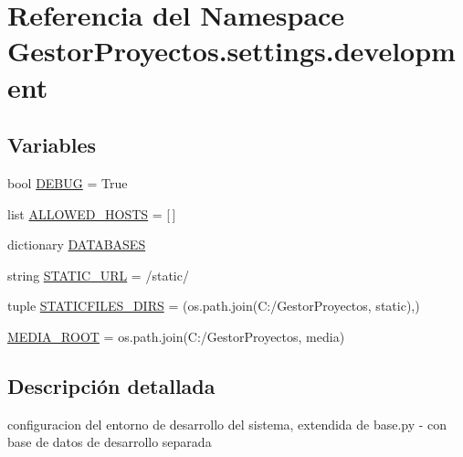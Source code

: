 \hypertarget{namespace_gestor_proyectos_1_1settings_1_1development}{}\section{Referencia del Namespace Gestor\+Proyectos.\+settings.\+development}
\label{namespace_gestor_proyectos_1_1settings_1_1development}
\subsection*{Variables}
\begin{DoxyCompactItemize}
\item 
bool \hyperlink{namespace_gestor_proyectos_1_1settings_1_1development_a36c3ebf8a573165139bc1e71d7fdb026}{D\+E\+B\+UG} = True
\item 
list \hyperlink{namespace_gestor_proyectos_1_1settings_1_1development_a8693bb1e864b19e170e272c94b739609}{A\+L\+L\+O\+W\+E\+D\+\_\+\+H\+O\+S\+TS} = \mbox{[}$\,$\mbox{]}
\item 
dictionary \hyperlink{namespace_gestor_proyectos_1_1settings_1_1development_ad1fb7c89daf8ad1f355d0fcd3631d636}{D\+A\+T\+A\+B\+A\+S\+ES}
\item 
string \hyperlink{namespace_gestor_proyectos_1_1settings_1_1development_a659abb77c4c1394164349b020712fade}{S\+T\+A\+T\+I\+C\+\_\+\+U\+RL} = \textquotesingle{}/static/\textquotesingle{}
\item 
tuple \hyperlink{namespace_gestor_proyectos_1_1settings_1_1development_a20b43056463f206b7faca50b3f3fcd3c}{S\+T\+A\+T\+I\+C\+F\+I\+L\+E\+S\+\_\+\+D\+I\+RS} = (os.\+path.\+join(\textquotesingle{}C\+:/Gestor\+Proyectos\textquotesingle{}, \textquotesingle{}static\textquotesingle{}),)
\item 
\hyperlink{namespace_gestor_proyectos_1_1settings_1_1development_a01d424d0a41e5027002458ee71ae36b2}{M\+E\+D\+I\+A\+\_\+\+R\+O\+OT} = os.\+path.\+join(\textquotesingle{}C\+:/Gestor\+Proyectos\textquotesingle{}, \textquotesingle{}media\textquotesingle{})
\end{DoxyCompactItemize}


\subsection{Descripción detallada}
\begin{DoxyVerb}configuracion del entorno de desarrollo del sistema, extendida de base.py
- con base de datos de desarrollo separada
\end{DoxyVerb}
 

